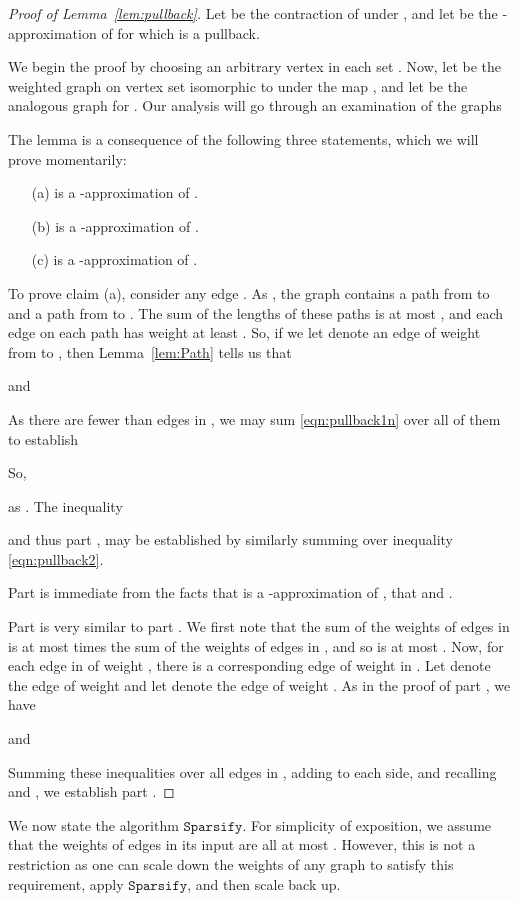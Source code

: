 \documentclass[11pt]{article}
\newcommand{\sparsify}{\ensuremath{\mathtt{Sparsify}}}
\begin{document}
\begin{proof}[Proof of Lemma~\ref{lem:pullback}]
Let  be the contraction of  under ,
  and let  be the -approximation of 
  for which  is a pullback.

We begin the proof by choosing an arbitrary vertex  in each set .
Now, let  be the weighted
  graph on vertex set 
  isomorphic to  under the map ,
 and let  be the analogous graph for .
Our analysis will go through an examination of the graphs

The lemma is a consequence of the following three statements,
  which we will prove momentarily:
\begin{itemize}
\item [(a)]  is a -approximation of .
\item [(b)]  is a -approximation of .
\item [(c)]  is a -approximation of .
\end{itemize}
To prove claim (a), consider any edge .
As , the graph
   contains a path from
   to  and a path from  to .
The sum of the lengths of these paths is at most , and each
  edge on each path has weight at least .
So, if we let  denote an edge of weight  from
   to ,
  then Lemma~\ref{lem:Path} tells us that

and

As there are fewer than  edges in , we may
 sum \eqref{eqn:pullback1n} over all of them 
  to establish

So,

as .
The inequality

and thus part , may be established by similarly summing
  over inequality \eqref{eqn:pullback2}.

Part  is immediate from the facts that
    is a -approximation
  of , that  and .

Part  is very similar to part .
We first note that the sum of the weights of edges in 
  is at most  times the sum of the weights of edges
  in , and so is at most .
Now, for each edge  in  of weight , there is
  a corresponding edge  of weight 
  in .
Let  denote the edge  of weight  and let  denote
  the edge  of weight .
As in the proof of part , we have

and

Summing these inequalities over all edges in ,
  adding  to each side, and recalling
   and ,
  we establish part .
\end{proof}

We now state the algorithm \sparsify .
For simplicity of exposition, 
  we assume that the weights of edges in its input are all
  at most .
However, this is not a restriction as one can scale down
   the weights of any graph to satisfy this requirement, apply \sparsify ,
  and then scale back up.
\end{document}
